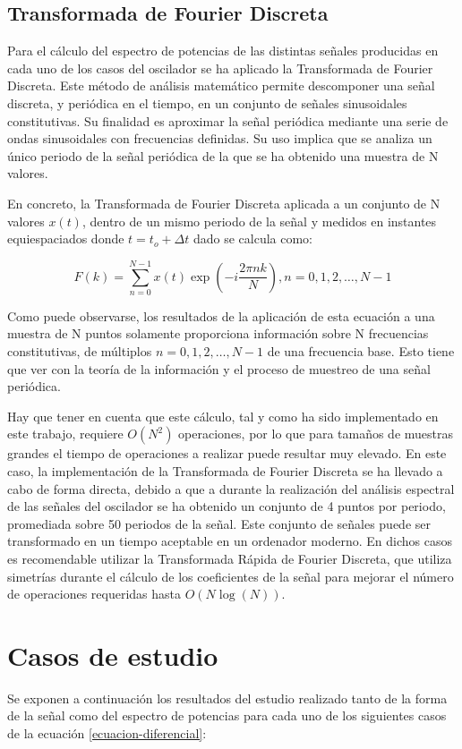 \documentclass[11pt]{article}
\begin{document}
\subsection{Transformada de Fourier Discreta}
Para el cálculo del espectro de potencias de las distintas señales producidas en cada uno de los casos del oscilador se ha aplicado la Transformada de Fourier Discreta. Este método de análisis matemático permite descomponer una señal discreta, y periódica en el tiempo, en un conjunto de señales sinusoidales constitutivas. Su finalidad es aproximar la señal periódica mediante una serie de ondas sinusoidales con frecuencias definidas. Su uso implica que se analiza un único periodo de la señal periódica de la que se ha obtenido una muestra de N valores.

En concreto, la Transformada de Fourier Discreta aplicada a un conjunto de N valores $x(t)$, dentro de un mismo periodo de la señal y medidos en instantes equiespaciados donde $t = t_o + \Delta{t}$ dado se calcula como:

\begin{equation}
	F(k) = \sum\limits_{n=0}^{N-1} x(t) \exp(-i \frac{2\pi{}nk}{N}), n = 0, 1, 2, \ldots, N -1
\end{equation}

Como puede observarse, los resultados de la aplicación de esta ecuación a una muestra de N puntos solamente proporciona información sobre N frecuencias constitutivas, de múltiplos $n = 0, 1, 2, \ldots, N -1$ de una frecuencia base. Esto tiene que ver con la teoría de la información y el proceso de muestreo de una señal periódica.

Hay que tener en cuenta que este cálculo, tal y como ha sido implementado en este trabajo, requiere $O(N^2)$ operaciones, por lo que para tamaños de muestras grandes el tiempo de operaciones a realizar puede resultar muy elevado. En este caso, la implementación de la Transformada de Fourier Discreta se ha llevado a cabo de forma directa, debido a que a durante la realización del análisis espectral de las señales del oscilador se ha obtenido un conjunto de 4 puntos por periodo, promediada sobre 50 periodos de la señal. Este conjunto de señales puede ser transformado en un tiempo aceptable en un ordenador moderno. En dichos casos es recomendable utilizar la Transformada Rápida de Fourier Discreta, que utiliza simetrías durante el cálculo de los coeficientes de la señal para mejorar el número de operaciones requeridas hasta $O(N\log(N))$.

\section{Casos de estudio}
Se exponen a continuación los resultados del estudio realizado tanto de la forma de la señal como del espectro de potencias para cada uno de los siguientes casos de la ecuación \ref{ecuacion-diferencial}:
\end{document}
